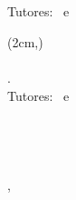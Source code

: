 \begin{titlepage}
	\pdfbookmark[0]{\thesisTitle}{\thesisTitle}
	\selectfont
	\centering
	\MUniCSCover
	\vfill
	{\fontsize{26pt}{26pt}\selectfont\raleway\color{white}\bfseries{\thesisTitle} \\[10mm]}
	{\fontsize{20pt}{20pt}\raleway\color{white}\thesisName} \\[5mm]
	{\raleway\color{lightgray} Tutores: \thesisFirstSupervisor\ e \thesisSecondSupervisor}
	\vfill

	{\raleway\color{white}\thesisDate}
	\restoregeometry


\end{titlepage}



\clearpage
\begin{textblock*}{16cm}(2cm,\dimexpr\paperheight-8cm\relax)
	\small
	\textbf{\thesisName} \\
	\textit{\thesisTitle} \\
	\thesisSubject. \thesisDate \\
	Tutores: \thesisFirstSupervisor\ e \thesisSecondSupervisor \\[1.5em]
	\textbf{\thesisUniversityStudies} \\
	\textit{\thesisUniversity} \\
	\thesisUniversitySchool \\
	\thesisUniversityStreetAddress \\
	\thesisUniversityPostalCode, \thesisUniversityCity
\end{textblock*}
